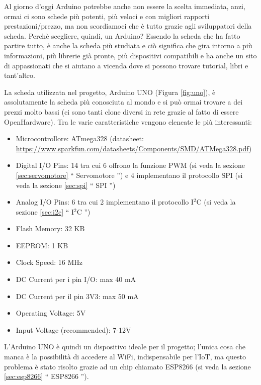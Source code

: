 \documentclass[12pt]{report}
\begin{document}
Al giorno d'oggi Arduino potrebbe anche non essere la scelta immediata, anzi, ormai ci sono schede più potenti, più veloci e con migliori rapporti prestazioni/prezzo, ma non scordiamoci che è tutto grazie agli sviluppatori della scheda. Perchè scegliere, quindi, un Arduino? Essendo la scheda che ha fatto partire tutto, è anche la scheda più studiata e ciò significa che gira intorno a più informazioni, più librerie già pronte, più dispositivi compatibili e ha anche un sito di appassionati che si aiutano a vicenda dove si possono trovare tutorial, libri e tant'altro.

La scheda utilizzata nel progetto, Arduino UNO (Figura \ref{fig:uno}), è assolutamente la scheda più conosciuta al mondo e si può ormai trovare a dei prezzi molto bassi (ci sono tanti clone diversi in rete grazie al fatto di essere OpenHardware). Tra le varie caratteristiche vengono elencate le più interessanti:

\begin{itemize}
	\item Microcontrollore: ATmega328 (datasheet: \url{https://www.sparkfun.com/datasheets/Components/SMD/ATMega328.pdf})
	\item Digital I/O Pins: 14 tra cui 6 offrono la funzione PWM (si veda la sezione \ref{sec:servomotore} \textquotedblleft{} Servomotore \textquotedblright{}) e 4 implementano il protocollo SPI (si veda la sezione \ref{sec:spi} \textquotedblleft{} SPI \textquotedblright{})
	\item Analog I/O Pins: 6 tra cui 2 implementano il protocollo I$^2$C (si veda la sezione \ref{sec:i2c} \textquotedblleft{} I$^2$C \textquotedblright{})
	\item Flash Memory: 32 KB
	\item EEPROM: 1 KB
	\item Clock Speed: 16 MHz
	\item DC Current per i pin I/O: max 40 mA
	\item DC Current per il pin 3V3: max 50 mA
	\item Operating Voltage: 5V
	\item Input Voltage (recommended): 7-12V
\end{itemize}

L'Arduino UNO è quindi un dispositivo ideale per il progetto; l'unica cosa che manca è la possibilità di accedere al WiFi, indispensabile per l'IoT, ma questo problema è stato risolto grazie ad un chip chiamato ESP8266 (si veda la sezione \ref{sec:esp8266} \textquotedblleft{} ESP8266 \textquotedblright{}).
\end{document}
